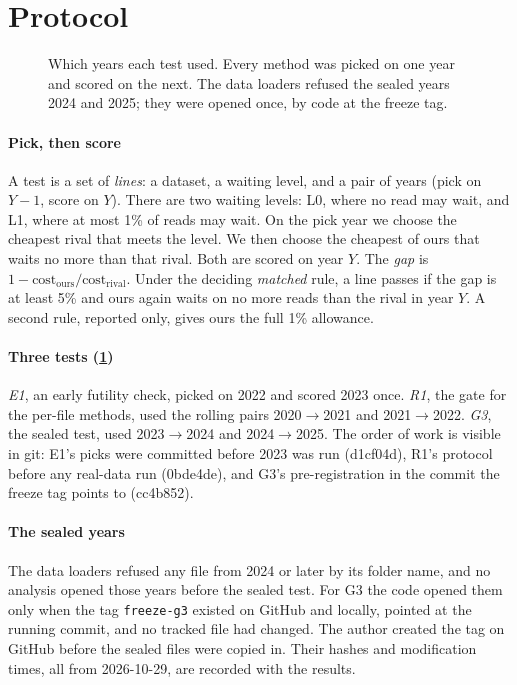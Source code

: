 \documentclass[11pt]{article}
\begin{document}
\section{Protocol}
\label{sec:protocol}

\begin{figure}[t]
\centering

\caption{Which years each test used. Every method was picked on one year and scored on the next. The data loaders refused the sealed years 2024 and 2025; they were opened once, by code at the freeze tag.}
\label{fig:timeline}
\end{figure}

\paragraph{Pick, then score} A test is a set of \emph{lines}: a dataset, a waiting level, and a pair of years (pick on $Y{-}1$, score on $Y$). There are two waiting levels: L0, where no read may wait, and L1, where at most 1\% of reads may wait. On the pick year we choose the cheapest rival that meets the level. We then choose the cheapest of ours that waits no more than that rival. Both are scored on year $Y$. The \emph{gap} is $1 - \text{cost}_{\text{ours}} / \text{cost}_{\text{rival}}$. Under the deciding \emph{matched} rule, a line passes if the gap is at least 5\% and ours again waits on no more reads than the rival in year $Y$. A second rule, reported only, gives ours the full 1\% allowance.

\paragraph{Three tests (\cref{fig:timeline})} \emph{E1}, an early futility check, picked on 2022 and scored 2023 once. \emph{R1}, the gate for the per-file methods, used the rolling pairs 2020$\to$2021 and 2021$\to$2022. \emph{G3}, the sealed test, used 2023$\to$2024 and 2024$\to$2025. The order of work is visible in git: E1's picks were committed before 2023 was run (d1cf04d), R1's protocol before any real-data run (0bde4de), and G3's pre-registration in the commit the freeze tag points to (cc4b852).

\paragraph{The sealed years} The data loaders refused any file from 2024 or later by its folder name, and no analysis opened those years before the sealed test. For G3 the code opened them only when the tag \texttt{freeze-g3} existed on GitHub and locally, pointed at the running commit, and no tracked file had changed. The author created the tag on GitHub before the sealed files were copied in. Their hashes and modification times, all from 2026-10-29, are recorded with the results.
\end{document}
